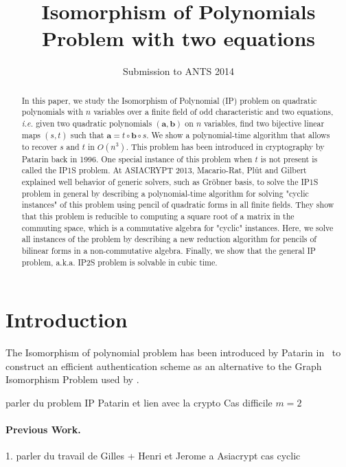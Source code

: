 \documentclass{lms}%
\begin{document}
\title{Isomorphism of Polynomials Problem with two equations}%
\author{Submission to ANTS 2014}
\maketitle

\begin{abstract}
In this paper, we study the Isomorphism of Polynomial (IP) problem on
quadratic polynomials with $n$ variables over a finite field of odd
characteristic and two equations, \textit{i.e.} given two quadratic
polynomials $(\bm{a},\bm{b})$ on $n$ variables, find two bijective linear
maps $(s,t)$ such that $\bm{a}=t\circ \bm{b}\circ s$. We show a
polynomial-time algorithm that allows to recover $s$ and $t$ in $O(n^3)$.
This problem has been introduced in cryptography by Patarin back in 1996.
One special instance of this problem when $t$ is not present is called
the IP1S problem. At ASIACRYPT 2013, Macario-Rat, Pl\^ut and Gilbert
explained well behavior of generic solvers, such as Gr\"obner basis, to
solve the IP1S problem in general by describing a polynomial-time
algorithm for solving "cyclic instances" of this problem using pencil of
quadratic forms in all finite fields. They show that this problem is
reducible to computing a square root of a matrix in the commuting space,
which is a commutative algebra for "cyclic" instances. Here, we solve all
instances of the problem by describing a new reduction algorithm for
pencils of bilinear forms in a non-commutative algebra. Finally, we show
that the general IP problem, a.k.a. IP2S problem is solvable in cubic
time.
\end{abstract}

\section{Introduction}
The Isomorphism of polynomial problem has been introduced by Patarin in~\cite{DBLP:conf/eurocrypt/Patarin96} to construct an efficient authentication scheme as an alternative to the Graph Isomorphism Problem used by . 

parler du problem IP Patarin et lien avec la crypto
Cas difficile $m=2$

\paragraph{Previous Work.}
1. parler du travail de Gilles + Henri et Jerome a Asiacrypt cas cyclic
\end{document}

